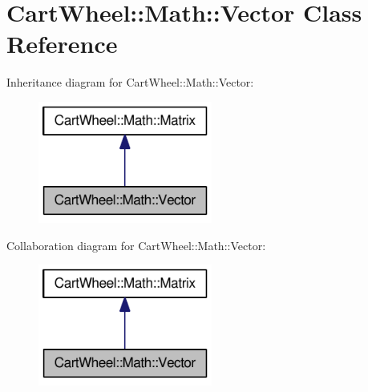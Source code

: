 \hypertarget{classCartWheel_1_1Math_1_1Vector}{
\section{CartWheel::Math::Vector Class Reference}
\label{classCartWheel_1_1Math_1_1Vector}
}


Inheritance diagram for CartWheel::Math::Vector:\nopagebreak
\begin{figure}[H]
\begin{center}
\leavevmode
\includegraphics[width=162pt]{classCartWheel_1_1Math_1_1Vector__inherit__graph}
\end{center}
\end{figure}


Collaboration diagram for CartWheel::Math::Vector:\nopagebreak
\begin{figure}[H]
\begin{center}
\leavevmode
\includegraphics[width=162pt]{classCartWheel_1_1Math_1_1Vector__coll__graph}
\end{center}
\end{figure}
